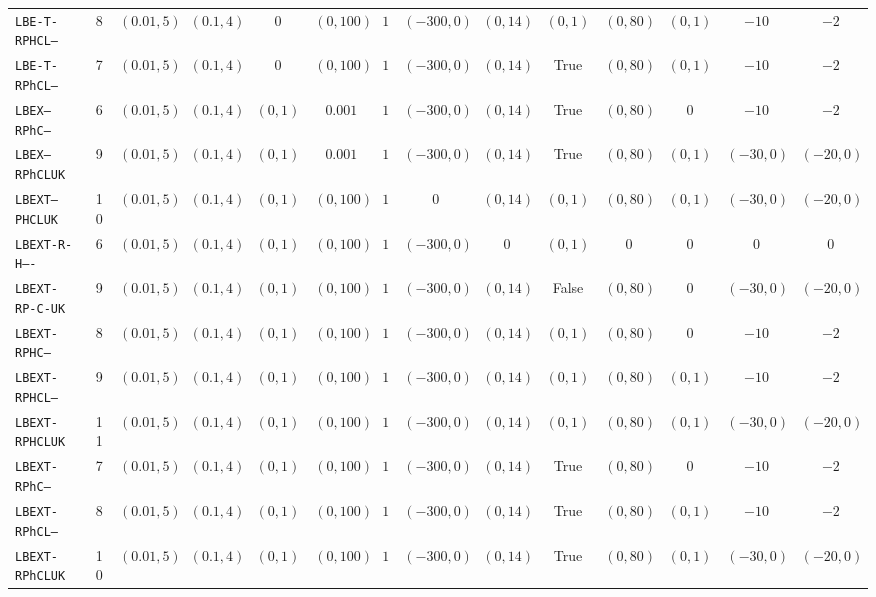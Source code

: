 {\begin{tabular}{l c c c c c c c c c c c c c }
\texttt{LBE-T-RPHCL--} & 8 & $(0.01, 5)$ & $(0.1, 4)$ & $0$ & $(0, 100)$ & $1$ & $(-300, 0)$ & $(0, 14)$ & $(0, 1)$ & $(0, 80)$ & $(0, 1)$ & $-10$ & $-2$ \\
\texttt{LBE-T-RPhCL--} & 7 & $(0.01, 5)$ & $(0.1, 4)$ & $0$ & $(0, 100)$ & $1$ & $(-300, 0)$ & $(0, 14)$ & \textrm{True} & $(0, 80)$ & $(0, 1)$ & $-10$ & $-2$ \\
\texttt{LBEX--RPhC---} & 6 & $(0.01, 5)$ & $(0.1, 4)$ & $(0, 1)$ & $0.001$ & $1$ & $(-300, 0)$ & $(0, 14)$ & \textrm{True} & $(0, 80)$ & $0$ & $-10$ & $-2$ \\
\texttt{LBEX--RPhCLUK} & 9 & $(0.01, 5)$ & $(0.1, 4)$ & $(0, 1)$ & $0.001$ & $1$ & $(-300, 0)$ & $(0, 14)$ & \textrm{True} & $(0, 80)$ & $(0, 1)$ & $(-30, 0)$ & $(-20, 0)$ \\
\texttt{LBEXT--PHCLUK} & 10 & $(0.01, 5)$ & $(0.1, 4)$ & $(0, 1)$ & $(0, 100)$ & $1$ & $0$ & $(0, 14)$ & $(0, 1)$ & $(0, 80)$ & $(0, 1)$ & $(-30, 0)$ & $(-20, 0)$ \\
\texttt{LBEXT-R-H----} & 6 & $(0.01, 5)$ & $(0.1, 4)$ & $(0, 1)$ & $(0, 100)$ & $1$ & $(-300, 0)$ & $0$ & $(0, 1)$ & $0$ & $0$ & $0$ & $0$ \\
\texttt{LBEXT-RP-C-UK} & 9 & $(0.01, 5)$ & $(0.1, 4)$ & $(0, 1)$ & $(0, 100)$ & $1$ & $(-300, 0)$ & $(0, 14)$ & \textrm{False} & $(0, 80)$ & $0$ & $(-30, 0)$ & $(-20, 0)$ \\
\texttt{LBEXT-RPHC---} & 8 & $(0.01, 5)$ & $(0.1, 4)$ & $(0, 1)$ & $(0, 100)$ & $1$ & $(-300, 0)$ & $(0, 14)$ & $(0, 1)$ & $(0, 80)$ & $0$ & $-10$ & $-2$ \\
\texttt{LBEXT-RPHCL--} & 9 & $(0.01, 5)$ & $(0.1, 4)$ & $(0, 1)$ & $(0, 100)$ & $1$ & $(-300, 0)$ & $(0, 14)$ & $(0, 1)$ & $(0, 80)$ & $(0, 1)$ & $-10$ & $-2$ \\
\texttt{LBEXT-RPHCLUK} & 11 & $(0.01, 5)$ & $(0.1, 4)$ & $(0, 1)$ & $(0, 100)$ & $1$ & $(-300, 0)$ & $(0, 14)$ & $(0, 1)$ & $(0, 80)$ & $(0, 1)$ & $(-30, 0)$ & $(-20, 0)$ \\
\texttt{LBEXT-RPhC---} & 7 & $(0.01, 5)$ & $(0.1, 4)$ & $(0, 1)$ & $(0, 100)$ & $1$ & $(-300, 0)$ & $(0, 14)$ & \textrm{True} & $(0, 80)$ & $0$ & $-10$ & $-2$ \\
\texttt{LBEXT-RPhCL--} & 8 & $(0.01, 5)$ & $(0.1, 4)$ & $(0, 1)$ & $(0, 100)$ & $1$ & $(-300, 0)$ & $(0, 14)$ & \textrm{True} & $(0, 80)$ & $(0, 1)$ & $-10$ & $-2$ \\
\texttt{LBEXT-RPhCLUK} & 10 & $(0.01, 5)$ & $(0.1, 4)$ & $(0, 1)$ & $(0, 100)$ & $1$ & $(-300, 0)$ & $(0, 14)$ & \textrm{True} & $(0, 80)$ & $(0, 1)$ & $(-30, 0)$ & $(-20, 0)$ \\
\bottomrule
\end{tabular}}
